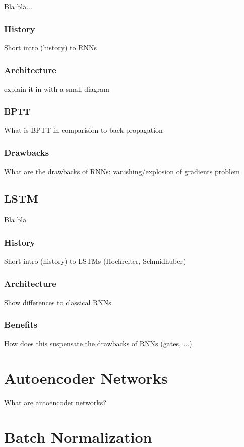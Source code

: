 Bla bla...

\subsubsection{History}
Short intro (history) to RNNs

\subsubsection{Architecture}
explain it in with a small diagram

\subsubsection{BPTT}
What is BPTT in comparision to back propagation

\subsubsection{Drawbacks} \label{sec:rnn-drawbacks}
What are the drawbacks of RNNs: vanishing/explosion of gradients problem

\subsection{LSTM}

Bla bla

\subsubsection{History}
Short intro (history) to LSTMs (Hochreiter, Schmidhuber)

\subsubsection{Architecture}
Show differences to classical RNNs

\subsubsection{Benefits}
How does this suspensate the drawbacks of RNNs (gates, ...)


\section{Autoencoder Networks} \label{sec:autoencoder}

What are autoencoder networks?


\section{Batch Normalization}

